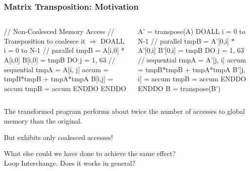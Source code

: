 \documentclass{beamer}
\renewcommand{\emph}[1]{\textcolor{structure}{#1}}
\newcommand{\emp}[1]{\textcolor{DikuRed}{ #1}}
\newcommand{\mymath}[1]{$ #1 $}
\begin{document}
\begin{frame}[fragile]
	\tableofcontents[currentsection]
\end{frame}

\begin{frame}[fragile,t]
  \frametitle{Matrix Transposition: Motivation} 

\begin{columns}
\begin{colorcode}[fontsize=\scriptsize]
// Non-Coalesced Memory Access
// Transposition to coalesce it \mymath{\Rightarrow}
DOALL i = 0 to N-1  // \emph{parallel}
  tmpB = A[i,0] * A[i,0]
  B[i,0] = tmpB
  DO j = 1, 63 // \emp{sequential}
    tmpA   = A[i, j]
    accum  = tmpB*tmpB + tmpA*tmpA
    B[i,j] = accum
    tmpB   = accum
  ENDDO
ENDDO
\end{colorcode}
\begin{colorcode}[fontsize=\scriptsize]
A' = transpose(A)
DOALL i = 0 to N-1  // \emph{parallel}
  tmpB = A'[0,i] * A'[0,i]
  B'[0,i] = tmpB
  DO j = 1, 63 // \emp{sequential}
    tmpA   = A'[j, i]
    accum  = tmpB*tmpB + tmpA*tmpA
    B'[j, i] = accum
    tmpB     = accum
  ENDDO
ENDDO
B = transpose(B')
\end{colorcode}
\end{columns}
\bigskip

\emp{The transformed program performs about twice the number of
accesses to global memory than the original.}  
\bigskip

\emph{But exhibits only coalesced accesses!}
\bigskip

\alert{What else could we have done to achieve the same effect?}\\\pause
\emph{Loop Interchange. Does it works in general?}
\end{frame}
\end{document}

